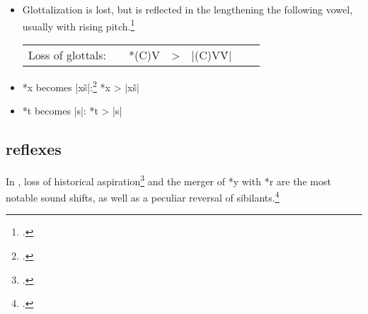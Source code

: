 \documentclass[output=paper]{LSP/langsci}
\begin{document}
\begin{itemize}
\item Glottalization is lost, but is reflected in the lengthening the following vowel, usually with rising pitch.\footnote{\citealt[232]{Rankinetal2006PDF}.}



\begin{tabular}[t]{c c c c c c c}
Loss of glottals:	 & & *(C)\textsuperscript{\textipa{P}}V & > & |(C)V\'V|
\end{tabular}

\item *x becomes |xš|:\footnote{	\citealt[124]{Rankinetal2006PDF}.}	\hspace{1em} *x	>	|xš|
\item *t becomes |s|: \hspace{2em}  *t	>	|s|
\end{itemize}

\subsection{ reflexes}

In , loss of historical aspiration\footnote{\citealt[50]{Rankinetal2006PDF}.} and the merger of *y with *r are the most notable sound shifts, as well as a peculiar reversal of sibilants.\footnote{\citealt[126]{Rankinetal2006PDF}.}
\end{document}
